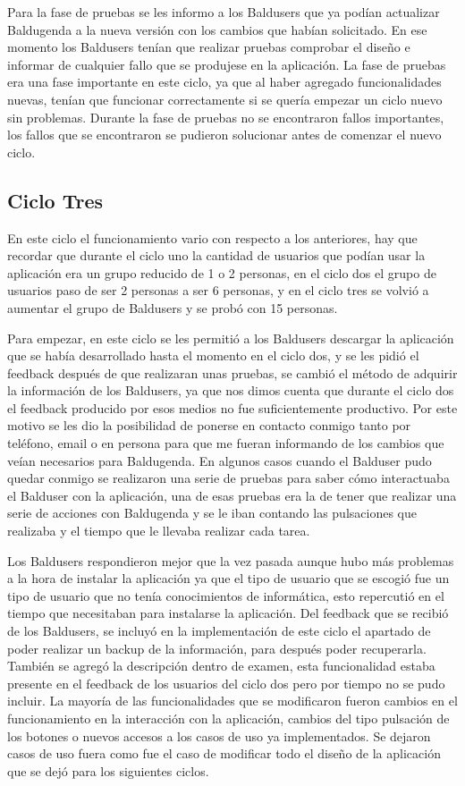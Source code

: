 Para la fase de pruebas se les informo a los Baldusers que ya podían actualizar Baldugenda a la nueva versión con los cambios que habían solicitado. En ese momento los Baldusers tenían que realizar pruebas comprobar el diseño e informar de  cualquier fallo que se produjese en la aplicación. La fase de pruebas era una fase importante en este ciclo, ya que al haber agregado funcionalidades nuevas, tenían que funcionar correctamente si se quería empezar un ciclo nuevo sin problemas. Durante la fase de pruebas no se encontraron fallos importantes, los fallos que se encontraron se pudieron solucionar antes de comenzar el nuevo ciclo.

\subsection{Ciclo Tres}
\label{subsecc:ciclo Tres}

En este ciclo el funcionamiento vario con respecto a los anteriores, hay que recordar que durante el ciclo uno la cantidad de usuarios que podían usar la aplicación era un grupo reducido de 1 o 2 personas, en el ciclo dos el grupo de usuarios paso de ser 2 personas a ser 6 personas, y en el ciclo tres se volvió a aumentar el grupo de Baldusers y se probó con 15 personas.

Para empezar, en este ciclo se les permitió a los Baldusers descargar la aplicación que se había desarrollado hasta el momento en el ciclo dos, y se les pidió el feedback después de que realizaran unas pruebas, se cambió el método de adquirir la información de los Baldusers, ya que nos dimos cuenta que durante el ciclo dos el feedback producido por esos medios no fue suficientemente productivo. Por este motivo se les dio la posibilidad de ponerse en contacto conmigo tanto por teléfono, email o en persona para que me fueran informando de los cambios que veían necesarios para Baldugenda.
En algunos casos cuando el Balduser pudo quedar conmigo se realizaron una serie de pruebas para saber cómo interactuaba el Balduser con la aplicación, una de esas pruebas era la de tener que realizar una serie de acciones con Baldugenda y se le iban contando las pulsaciones que realizaba y el tiempo que le llevaba realizar cada tarea.

Los Baldusers respondieron mejor que la vez pasada aunque hubo más problemas a la hora de instalar la aplicación ya que el tipo de usuario que se escogió fue un tipo de usuario que no tenía conocimientos de informática, esto repercutió en el tiempo que necesitaban para instalarse la aplicación. Del feedback que se recibió de los Baldusers, se incluyó en la implementación de este ciclo el apartado de poder realizar un backup de la información, para después poder recuperarla. También se agregó la descripción dentro de examen, esta funcionalidad estaba presente en el feedback de los usuarios del ciclo dos pero por tiempo no se pudo incluir. La mayoría de las funcionalidades que se modificaron fueron cambios en el funcionamiento en la interacción con la aplicación, cambios del tipo pulsación de los botones o nuevos accesos a los casos de uso ya implementados. Se dejaron casos de uso fuera como fue el caso de modificar todo el diseño de la aplicación que se dejó para los siguientes ciclos.

